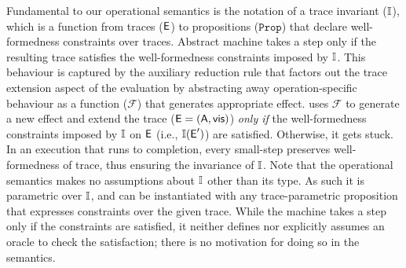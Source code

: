 Fundamental to our operational semantics is the notation of a trace
invariant ($\mathbb{I}$), which is a function from traces ($\textsf{E}$) to
propositions ($\texttt{Prop}$) that declare well-formedness
constraints over traces. Abstract machine takes a step only if the
resulting trace satisfies the well-formedness constraints imposed by
$\mathbb{I}$. This behaviour is captured by the auxiliary reduction rule
 that factors out the trace extension aspect of the
evaluation by abstracting away operation-specific behaviour as a
function ($\mathcal{F}$) that generates appropriate effect.
 uses $\mathcal{F}$ to generate a new effect and
extend the trace ($\textsf{E} = (\textsf{A},\textsf{vis})$) \emph{only if} the
well-formedness constraints imposed by $\mathbb{I}$ on $\textsf{E}$ (i.e., $\mathbb{I}(\textsf{E}')$)
are satisfied. Otherwise, it gets stuck. In an execution that runs to
completion, every small-step preserves well-formedness of trace, thus
ensuring the invariance of $\mathbb{I}$. Note that the operational semantics
makes no assumptions about $\mathbb{I}$ other than its type. As such it is
parametric over $\mathbb{I}$, and can be instantiated with any
trace-parametric proposition that expresses constraints over the given
trace. While the machine takes a step only if the constraints are
satisfied, it neither defines nor explicitly assumes an oracle to
check the satisfaction; there is no motivation for doing so in the
semantics.


